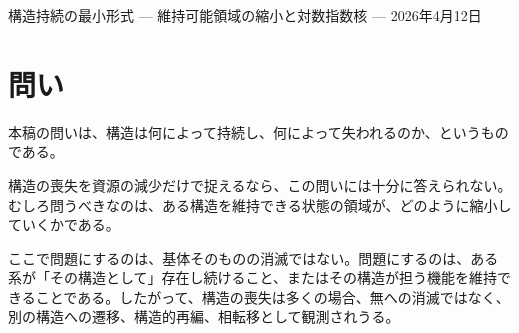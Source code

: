 \documentclass[12pt,a4paper]{article}
\begin{document}
\PaperTitleBlock
  {構造持続の最小形式}
  {— 維持可能領域の縮小と対数指数核 —}
  {2026年4月12日}

\begin{abstract}
構造が失われるのは、資源が尽きるときだけではない。資源がなお残っていても、制約の蓄積によって、その構造を維持できる状態の領域が縮小し、ついにはその構造として保てる状態が残らなくなることがある。本稿は、この事実を表す最小形式を与える。ここでいう最小形式とは、自明な前提ではなく、構造喪失を維持可能領域の縮小として測るための第一の非自明な形式核である。

事前固定された構造維持問題において、構造維持可能状態集合の逐次縮小を考える。段階構造消耗に対する自然な公理系、すなわち比率依存性、正規化、加法性、連続性のもとで、構造消耗の関数形は対数比として一意に定まる。そのうえで、累積構造消耗量の望遠鏡積として

\[
m(V^{(n)}) = m(V^{(0)}) e^{-L_{n}}
\]

が恒等的に成り立つ。したがって指数核は、追加の経験的仮定ではなく、公理系と測度比の乗法性から導かれる形式である。

本稿の意義は、構造の喪失を資源枯渇だけではなく、維持可能領域の縮小として定式化し、その自然な尺度が対数比に強制されることを示す点にある。したがって、本稿の主張は望遠鏡積そのものが珍しいということではない。非自明なのは、何を維持可能領域として固定し、どの測度でその縮小を読むかを事前に定め、その座標のもとで指数核を経験法則ではなく表現形式として切り出す点である。

最後に、有効維持余力 \(M\) をリソース側のスカラーとして別途導入し、構造持続ポテンシャルを

\[
S = M e^{-L}
\]

と定義する。ここで \(M\) は指数核そのものから導かれる量ではなく、対象となる構造条件を維持するためにその時点で使える有効維持余力を外側に明示するための項である。
\end{abstract}

\section{問い}\label{ux554fux3044}

本稿の問いは、構造は何によって持続し、何によって失われるのか、というものである。

構造の喪失を資源の減少だけで捉えるなら、この問いには十分に答えられない。むしろ問うべきなのは、ある構造を維持できる状態の領域が、どのように縮小していくかである。

ここで問題にするのは、基体そのものの消滅ではない。問題にするのは、ある系が「その構造として」存在し続けること、またはその構造が担う機能を維持できることである。したがって、構造の喪失は多くの場合、無への消滅ではなく、別の構造への遷移、構造的再編、相転移として観測されうる。
\end{document}
